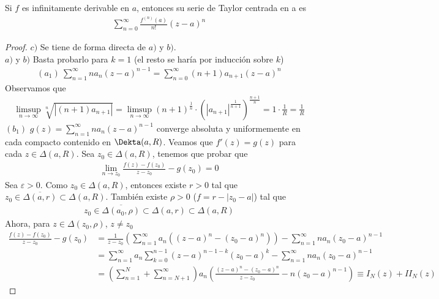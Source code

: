 \begin{defi}
Si $f$ es infinitamente derivable en $a$, entonces su serie de Taylor centrada en a es
\begin{align*}
    \sum_{n=0}^{\infty}{\frac{f^{(n)}(a)}{n!}(z-a)^n}
\end{align*}
\end{defi}

\begin{proof}
$c)$ Se tiene de forma directa de $a)$ y $b)$.
\\
\newline
$a)$ y $b)$ Basta probarlo para $k = 1$ (el resto se haría por inducción sobre $k$)
\begin{align*}
    (a_1) \ \sum_{n=1}^{\infty}{na_n(z-a)^{n-1}} = \sum_{n=0}^{\infty}{(n+1)a_{n+1}(z-a)^n}
\end{align*}
Observamos que
\begin{align*}
    \limsup_{n \to \infty}{\sqrt[n]{|(n+1)a_{n+1}|}} = \limsup_{n \to \infty}{(n+1)^{\frac{1}{n}} \cdot \left( |a_{n+1}|^{\frac{1}{n+1}}\right)^{\frac{n+1}{n}}} = 1 \cdot \frac{1}{R} = \frac{1}{R}
\end{align*}
$(b_1)$ $g(z) = \sum_{n=1}^{\infty}{na_n(z-a)^{n-1}}$ converge absoluta y uniformemente en cada compacto contenido en $\Dekta(a,R)$. Veamos que $f'(z) = g(z)$ para cada $z \in \Delta(a,R)$. Sea $z_0 \in \Delta(a,R)$, tenemos que probar que
\begin{align*}
    \lim_{n \to z_0}{\frac{f(z) - f(z_0)}{z-z_0} - g(z_0) = 0}
\end{align*}
Sea $\varepsilon > 0$. Como $z_0 \in \Delta(a,R)$, entonces existe $r > 0$ tal que $z_0 \in \overline{\Delta(a,r)} \subset \Delta(a,R)$. También existe $\rho > 0$ ($f = r - |z_0 -a|$) tal que
\begin{align*}
    z_0 \in \overline{\Delta(a_0,\rho)} \subset \Delta(a,r) \subset \Delta(a,R)
\end{align*}
Ahora, para $z \in \Delta(z_0,\rho)$, $z \not = z_0$
\begin{align*}
    \frac{f(z) - f(z_0)}{z-z_0} - g(z_0) &= \frac{1}{z-z_0}\left( \sum_{n=1}^{\infty}{a_n((z-a)^n - (z_0 - a)^n)}\right) - \sum_{n=1}^{\infty}{na_n(z_0 -a)^{n-1}} \\
    &= \sum_{n=1}^{\infty}{a_n \sum_{k=0}^{n-1}{(z-a)^{n-1-k}(z_0 -a)^k}} - \sum_{n=1}^{\infty}{na_n(z_0-a)^{n-1}} \\
    &= \left( \sum_{n=1}^{N} + \sum_{n=N+1}^{\infty}\right)a_n\left( \frac{(z-a)^{n} - (z_0-a)^n}{z-z_0} -n(z_0-a)^{n-1}\right) \equiv I_N(z) + II_N(z)

\end{align*}
\end{proof}
